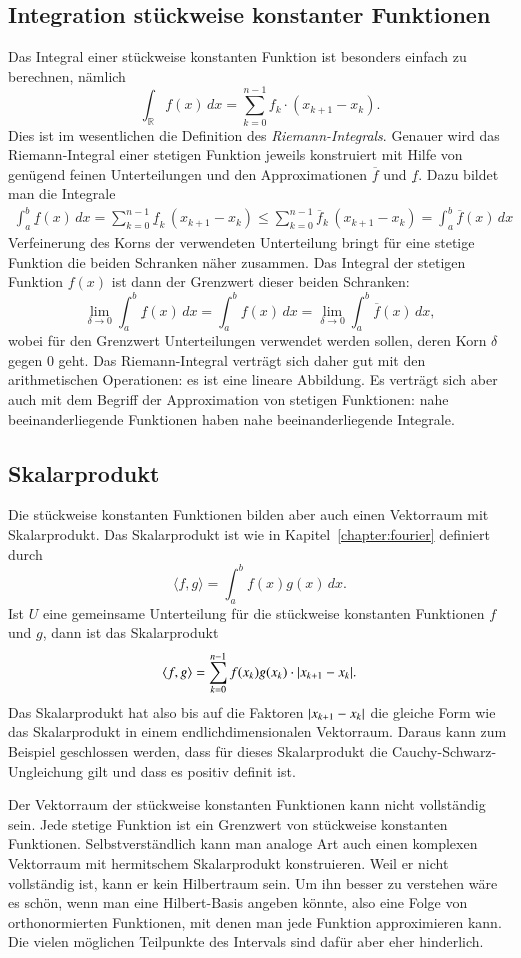 \subsection{Integration stückweise konstanter Funktionen}
Das Integral einer stückweise konstanten Funktion ist besonders einfach 
zu berechnen, nämlich
\[
\int_{\mathbb R} f(x)\,dx = \sum_{k=0}^{n-1} f_k\cdot (x_{k+1}-x_k).
\]
Dies ist im wesentlichen die Definition des {\em Riemann-Integrals}.
%
Genauer wird das Riemann-Integral einer stetigen Funktion jeweils
konstruiert mit Hilfe von genügend feinen Unterteilungen und den
Approximationen $\overline{f}$ und $\underline{f}$.
Dazu bildet man die Integrale
\begin{align*}
\int_a^b \underline{f}(x)\,dx
=
\sum_{k=0}^{n-1} \underline{f}_{k}\,(x_{k+1}-x_k)
\le
\sum_{k=0}^{n-1} \overline{f}_{k}\,(x_{k+1}-x_k)
=
\int_a^b \overline{f}(x)\,dx
\end{align*}
Verfeinerung des Korns der verwendeten Unterteilung bringt für eine
stetige Funktion die beiden Schranken näher zusammen.
Das Integral der stetigen Funktion $f(x)$ ist dann der Grenzwert
dieser beiden Schranken:
\[
\lim_{\delta\to 0}
\int_a^b \underline{f}(x)\,dx
=
\int_a^b f(x)\,dx
=
\lim_{\delta\to 0}
\int_a^b \overline{f}(x)\,dx,
\]
wobei für den Grenzwert Unterteilungen verwendet werden sollen, deren
Korn $\delta$ gegen $0$ geht.
Das Riemann-Integral verträgt sich daher gut mit den arithmetischen
Operationen: es ist eine lineare Abbildung.
Es verträgt sich aber auch mit dem Begriff der Approximation von
stetigen Funktionen: nahe beeinanderliegende Funktionen haben nahe
beeinanderliegende Integrale.

\subsection{Skalarprodukt}
Die stückweise konstanten Funktionen bilden aber auch einen Vektorraum
mit Skalarprodukt.
Das Skalarprodukt ist wie in Kapitel~\ref{chapter:fourier} definiert durch
\[
\langle f,g\rangle
=
\int_a^b
f(x) g(x)\,dx.
\]
Ist $U$ eine gemeinsame Unterteilung für die stückweise konstanten
Funktionen $f$ und $g$, dann ist das Skalarprodukt
\[
\langle f,g\rangle
=
\sum_{k=0}^{n-1} f(x_k) g(x_k) \cdot |x_{k+1}-x_{k\mathstrut}|.
\]
Das Skalarprodukt hat also bis auf die Faktoren $|x_{k+1}-x_{k\mathstrut}|$
die gleiche Form wie das Skalarprodukt in einem endlichdimensionalen
Vektorraum.
Daraus kann zum Beispiel geschlossen werden, dass für dieses Skalarprodukt
die Cauchy-Schwarz-Ungleichung gilt und dass es positiv definit ist.

Der Vektorraum der stückweise konstanten Funktionen kann nicht vollständig
sein.
Jede stetige Funktion ist ein Grenzwert von stückweise konstanten
Funktionen.
Selbstverständlich kann man analoge Art auch einen komplexen
Vektorraum mit hermitschem Skalarprodukt konstruieren.
Weil er nicht vollständig ist, kann er kein Hilbertraum sein.
Um ihn besser zu verstehen wäre es schön, wenn man eine Hilbert-Basis
angeben könnte, also eine Folge von orthonormierten Funktionen, mit
denen man jede Funktion approximieren kann.
Die vielen möglichen Teilpunkte des Intervals sind dafür aber eher 
hinderlich.

